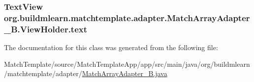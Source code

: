 \subsubsection[{\texorpdfstring{text}{text}}]{\setlength{\rightskip}{0pt plus 5cm}Text\+View org.\+buildmlearn.\+matchtemplate.\+adapter.\+Match\+Array\+Adapter\+\_\+\+B.\+View\+Holder.\+text}\hypertarget{classorg_1_1buildmlearn_1_1matchtemplate_1_1adapter_1_1MatchArrayAdapter__B_1_1ViewHolder_a1ca87dcafa34a416cd956629942ac2f5}{}\label{classorg_1_1buildmlearn_1_1matchtemplate_1_1adapter_1_1MatchArrayAdapter__B_1_1ViewHolder_a1ca87dcafa34a416cd956629942ac2f5}


The documentation for this class was generated from the following file\+:\begin{DoxyCompactItemize}
\item 
Match\+Template/source/\+Match\+Template\+App/app/src/main/java/org/buildmlearn/matchtemplate/adapter/\hyperlink{MatchArrayAdapter__B_8java}{Match\+Array\+Adapter\+\_\+\+B.\+java}\end{DoxyCompactItemize}
